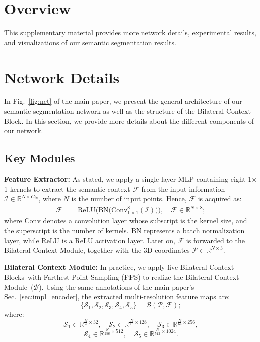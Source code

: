 \documentclass[10pt,twocolumn,letterpaper]{article}
\def\ourencoder{Bilateral Context Module}
\def\ourblock{Bilateral Context Block}
\def\ourblocks{Bilateral Context Blocks}
\def\ourextractor{Feature Extractor}
\begin{document}
\section{Overview}
This supplementary material provides more network details, experimental results, and visualizations of our semantic segmentation results.
\section{Network Details}
In Fig.~\ref{fig:net} of the main paper, we present the general architecture of our semantic segmentation network as well as the structure of the \ourblock. In this section, we provide more details about the different components of our network.

\subsection{Key Modules}
\noindent \textbf{\ourextractor:}  As stated, we apply a single-layer MLP containing eight 1$\times$1 kernels to extract the semantic context $\mathcal{F}$ from the input information $\mathcal{I}\in\mathbb{R}^{N\times C_{in}}$, where $N$ is the number of input points. Hence, $\mathcal{F}$ is acquired as:
$$
\begin{aligned}
    \mathcal{F} &= \mathrm{ReLU}\Big(\mathrm{BN}\big(\mathrm{Conv}_{1\times1}^{8}(\mathcal{I})\big)\Big), \quad \mathcal{F}\in\mathbb{R}^{N\times 8};
\end{aligned}
$$
where $\mathrm{Conv}$ denotes a convolution layer whose subscript is the kernel size, and the superscript is the number of kernels. $\mathrm{BN}$ represents a batch normalization layer, while $\mathrm{ReLU}$ is a ReLU activation layer. Later on, $\mathcal{F}$ is forwarded to the \ourencoder, together with the 3D coordinates $\mathcal{P}\in\mathbb{R}^{N\times 3}$.

\vspace{3mm}
\noindent \textbf{\ourencoder:}  In practice, we apply five \ourblocks~with Farthest Point Sampling (FPS) to realize the \ourencoder~($\mathcal{B}$). Using the same annotations of the main paper’s Sec.~\ref{sec:impl_encoder}, the extracted multi-resolution feature maps are:
$$
    \{{\mathcal{S}_1}, {\mathcal{S}_2}, {\mathcal{S}_3}, {\mathcal{S}_4}, {\mathcal{S}_5}\} = \mathcal{B}(\mathcal{P}, \mathcal{F});
$$
where:
$$
\mathcal{S}_1\in\mathbb{R}^{{\frac{N}{4}}\times 32}, \quad \mathcal{S}_2\in\mathbb{R}^{{\frac{N}{16}}\times 128}, \quad \mathcal{S}_3\in\mathbb{R}^{{\frac{N}{64}}\times 256},
$$
$$
 \mathcal{S}_4\in\mathbb{R}^{{\frac{N}{256}}\times 512}, \quad \mathcal{S}_5\in\mathbb{R}^{{\frac{N}{512}}\times 1024}.
$$
\end{document}
